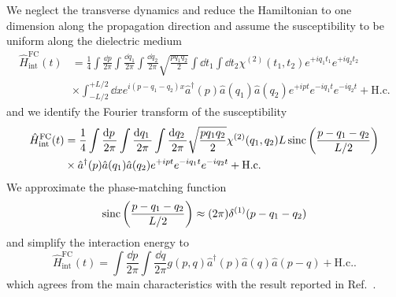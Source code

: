 We neglect the transverse dynamics and reduce the Hamiltonian to one dimension along the propagation direction and assume the susceptibility to be uniform along the dielectric medium
\begin{equation}
	\begin{split}
		\hat{H}_\text{int}^\text{FC}(t)
		&=
		\frac{1}{4}
		\int\frac{\dd{p}}{2\pi}
		\int\frac{\dd{q_1}}{2\pi}
		\int\frac{\dd{q_2}}{2\pi}
		\sqrt{\frac{pq_1q_2}{2}}
		\int\dd{t_1}
		\int\dd{t_2}
		\chi^{(2)}(t_1,t_2)
		e^{+iq_1t_1}
		e^{+iq_2t_2}
		\\
		&\times
		\int_{-L/2}^{+L/2}\dd{x}
		e^{i(p-q_1-q_2)x}
		\hat{a}^\dagger(p)
		\hat{a}(q_1)
		\hat{a}(q_2)
		e^{+ipt}
		e^{-iq_1t}
		e^{-iq_2t}
		+
		\text{H.c.}
	\end{split}
\end{equation}
and we identify the Fourier transform of the susceptibility
\begin{equation}
	\begin{split}
		\hat{H}_\text{int}^\text{FC}(t)
		&=
		\frac{1}{4}
		\int\frac{\dd{p}}{2\pi}
		\int\frac{\dd{q_1}}{2\pi}
		\int\frac{\dd{q_2}}{2\pi}
		\sqrt{\frac{pq_1q_2}{2}}
		\chi^{(2)}(q_1,q_2)L
		\sinc\left(\frac{p-q_1-q_2}{L/2}\right)
		\\
		&\times
		\hat{a}^\dagger(p)
		\hat{a}(q_1)
		\hat{a}(q_2)
		e^{+ipt}
		e^{-iq_1t}
		e^{-iq_2t}
		+
		\text{H.c.}
	\end{split}
\end{equation}
We approximate the phase-matching function
\begin{equation}
	\operatorname{sinc}\left(\frac{p-q_1-q_2}{L/2}\right)
	\approx
	(2\pi)
	\delta^{(1)}(p-q_1-q_2)
\end{equation}
and simplify the interaction energy to
\begin{equation}
	\hat{H}_\text{int}^\text{FC}(t)
	=
	\int\frac{\dd{p}}{2\pi}
	\int\frac{\dd{q}}{2\pi}
	g(p,q)
	\hat{a}^\dagger(p)
	\hat{a}(q)
	\hat{a}(p-q)
	+
	\text{H.c.}
	.
\end{equation}
which agrees from the main characteristics with the result reported in Ref.~\cite[eq.~35]{Horoshko2018}.